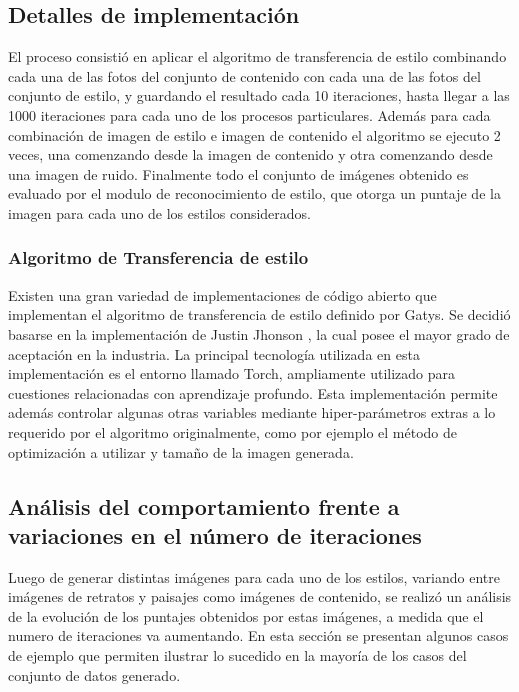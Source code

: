 \documentclass[a4paper,11pt,spanish]{book}
\begin{document}
    \subsection{Detalles de implementación}
      El proceso consistió en aplicar el algoritmo de transferencia de estilo combinando cada una de las fotos del conjunto de contenido con cada una de las fotos del conjunto de estilo,
      y guardando el resultado cada 10 iteraciones, hasta llegar a las 1000 iteraciones para cada uno de los procesos particulares.
      Además para cada combinación de imagen de estilo e imagen de contenido el algoritmo se ejecuto 2 veces, una comenzando desde la imagen de contenido y otra comenzando desde una imagen de ruido.
      Finalmente todo el conjunto de imágenes obtenido es evaluado por el modulo de reconocimiento de estilo, que otorga un puntaje de la imagen para cada uno de los estilos considerados.
      \subsubsection{Algoritmo de Transferencia de estilo}
	Existen una gran variedad de implementaciones de código abierto que implementan el algoritmo de transferencia de estilo definido por Gatys.
	Se decidió basarse en la implementación de Justin Jhonson \cite{Johnson:Neural_Style}, la cual posee el mayor grado de aceptación en la industria.
	La principal tecnología utilizada en esta implementación es el entorno llamado Torch, ampliamente utilizado para cuestiones relacionadas con aprendizaje profundo.
	Esta implementación permite además controlar algunas otras variables mediante hiper-parámetros extras a lo requerido por el algoritmo originalmente, 
	como por ejemplo el método de optimización a utilizar y tamaño de la imagen generada.

    \subsection{Análisis del comportamiento frente a variaciones en el número de iteraciones }
      Luego de generar distintas imágenes para cada uno de los estilos, variando entre imágenes de retratos y paisajes como imágenes de contenido, se realizó un análisis
      de la evolución de los puntajes obtenidos por estas imágenes, a medida que el numero de iteraciones va aumentando. En esta sección se presentan algunos casos de ejemplo
      que permiten ilustrar lo sucedido en la mayoría de los casos del conjunto de datos generado.
      
\end{document}
